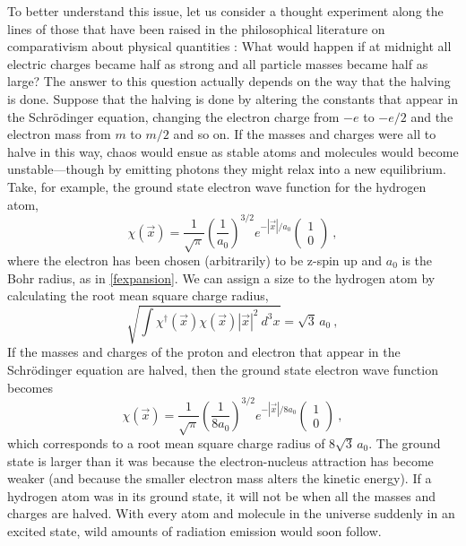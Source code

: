 \documentclass[onecolumn,secnumarabic,amsmath,amssymb,balancelastpage,nofootinbib]{article}
\begin{document}
To better understand this issue, let us consider a thought experiment along the lines of those that have been raised in the philosophical literature on comparativism about physical quantities \cite{dasgupta2013, dasguptaF, martens2017, martensF2, martensF, baker2021}:  What would happen if at midnight all electric charges became half as strong and all particle masses became half as large?  The answer to this question actually depends on the way that the halving is done.  Suppose that the halving is done by altering the constants that appear in the Schr\"{o}dinger equation, changing the electron charge from $-e$ to $-e/2$ and the electron mass from $m$ to $m/2$ and so on.  If the masses and charges were all to halve in this way, chaos would ensue as stable atoms and molecules would become unstable---though by emitting photons they might relax into a new equilibrium.  Take, for example, the ground state electron wave function for the hydrogen atom,
\begin{equation}
\chi(\vec{x})= \frac{1}{\sqrt{\pi}} \left(\frac{1}{a_0}\right)^{3/2}e^{- |\vec{x}| / a_0} \left(
\begin{matrix}
1 \\
0
\end{matrix}
\right)
\ ,
\label{hyrdogengroundstate}
\end{equation}
where the electron has been chosen (arbitrarily) to be z-spin up and $a_0$ is the Bohr radius, as in \eqref{fexpansion}.  We can assign a size to the hydrogen atom by calculating the root mean square charge radius,
\begin{equation}
\sqrt{\int{ \chi^{\dagger}(\vec{x}) \chi(\vec{x})|\vec{x}|^2 \  d^3 x }} = \sqrt{3} \, a_0
\ ,
\end{equation}
If the masses and charges of the proton and electron that appear in the Schr\"{o}dinger equation are halved, then the ground state electron wave function becomes
\begin{equation}
\chi(\vec{x})= \frac{1}{\sqrt{\pi}} \left(\frac{1}{8 a_0}\right)^{3/2}e^{- |\vec{x}| / 8 a_0} \left(
\begin{matrix}
1 \\
0
\end{matrix}
\right)
\ ,
\end{equation}
which corresponds to a root mean square charge radius of $8\sqrt{3} \, a_0$. The ground state is larger than it was because the electron-nucleus attraction has become weaker (and because the smaller electron mass alters the kinetic energy).  If a hydrogen atom was in its ground state, it will not be when all the masses and charges are halved.  With every atom and molecule in the universe suddenly in an excited state, wild amounts of radiation emission would soon follow.
\end{document}
